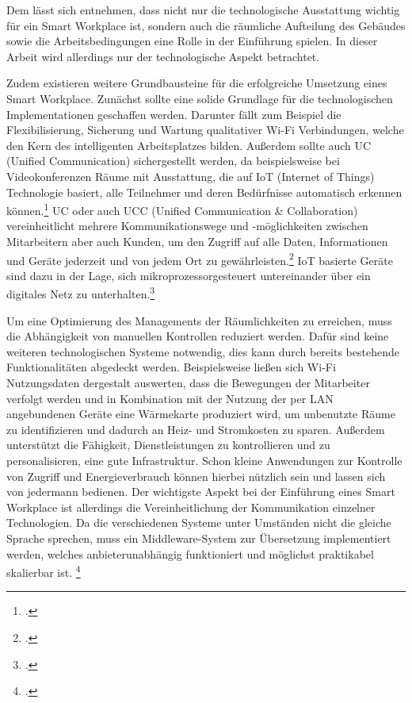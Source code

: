 Dem lässt sich entnehmen, dass nicht nur die technologische Ausstattung wichtig für ein Smart Workplace ist, sondern auch die räumliche Aufteilung des Gebäudes sowie die Arbeitsbedingungen eine Rolle in der Einführung spielen. In dieser Arbeit wird allerdings nur der technologische Aspekt betrachtet.

Zudem existieren weitere Grundbausteine für die erfolgreiche Umsetzung eines Smart Workplace. Zunächst sollte eine solide Grundlage für die technologischen Implementationen geschaffen werden. Darunter fällt zum Beispiel die Flexibilisierung, Sicherung und Wartung qualitativer Wi-Fi Verbindungen, welche den Kern des intelligenten Arbeitsplatzes bilden. Außerdem sollte auch UC (Unified Communication) sichergestellt werden, da beispielsweise bei Videokonferenzen Räume mit Ausstattung, die auf IoT (Internet of Things) Technologie basiert, alle Teilnehmer und deren Bedürfnisse automatisch erkennen können.\footcite[Vgl.][]{SCmagazineUK} UC oder auch UCC (Unified Communication \& Collaboration) vereinheitlicht mehrere Kommunikationswege und -möglichkeiten zwischen Mitarbeitern aber auch Kunden, um den Zugriff auf alle Daten, Informationen und Geräte jederzeit und von jedem Ort zu gewährleisten.\footcite[Vgl.][]{CompWoche} IoT basierte Geräte sind dazu in der Lage, sich mikroprozessorgesteuert untereinander über ein digitales Netz zu unterhalten.\footcite[Vgl.][]{mittelstand}

Um eine Optimierung des Managements der Räumlichkeiten zu erreichen, muss die Abhängigkeit von manuellen Kontrollen reduziert werden. Dafür sind keine weiteren technologischen Systeme notwendig, dies kann durch bereits bestehende Funktionalitäten abgedeckt werden. Beispielsweise ließen sich Wi-Fi Nutzungsdaten dergestalt auswerten, dass die Bewegungen der Mitarbeiter verfolgt werden und in Kombination mit der Nutzung der per LAN angebundenen Geräte eine Wärmekarte produziert wird, um unbenutzte Räume zu identifizieren und dadurch an Heiz- und Stromkosten zu sparen. Außerdem unterstützt die Fähigkeit, Dienstleistungen zu kontrollieren und zu personalisieren, eine gute Infrastruktur. Schon kleine Anwendungen zur Kontrolle von Zugriff und Energieverbrauch können hierbei nützlich sein und lassen sich von jedermann bedienen. Der wichtigste Aspekt bei der Einführung eines Smart Workplace ist allerdings die Vereinheitlichung der Kommunikation einzelner Technologien. Da die verschiedenen Systeme unter Umständen nicht die gleiche Sprache sprechen, muss ein Middleware-System zur Übersetzung implementiert werden, welches anbieterunabhängig funktioniert und möglichst praktikabel skalierbar ist.
\footcite[Vgl.][]{SCmagazineUK}
